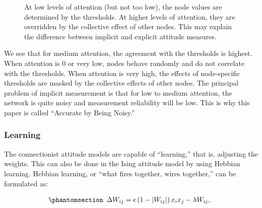 \documentclass[
  a4paper,
  DIV=11,
  numbers=noendperiod,
  oneside]{scrreprt}
\begin{document}
\begin{figure}


\caption{\label{fig-ch6-img13-old-82}At low levels of attention (but not
too low), the node values are determined by the thresholds. At higher
levels of attention, they are overridden by the collective effect of
other nodes. This may explain the difference between implicit and
explicit attitude measures.}

\end{figure}%

We see that for medium attention, the agreement with the thresholds is
highest. When attention is 0 or very low, nodes behave randomly and do
not correlate with the thresholds. When attention is very high, the
effects of node-specific thresholds are masked by the collective effects
of other nodes. The principal problem of implicit measurement is that
for low to medium attention, the network is quite noisy and measurement
reliability will be low. This is why this paper is called ``Accurate by
Being Noisy.''

\subsubsection{Learning}\label{sec-Learning}

The connectionist attitude models are capable of ``learning,'' that is,
adjusting the weights. This can also be done in the Ising attitude model
by using Hebbian learning. Hebbian learning, or ``what fires together,
wires together,'' can be formulated as:

\begin{equation}\phantomsection\label{eq-ch6-6-old-47}{\begin{array}{r}
\mathrm{\Delta}W_{ij} = \epsilon\left( 1 - \left| W_{ij} \right| \right)x_{i}x_{j} - \lambda W_{ij},
\end{array}}\end{equation}
\end{document}
